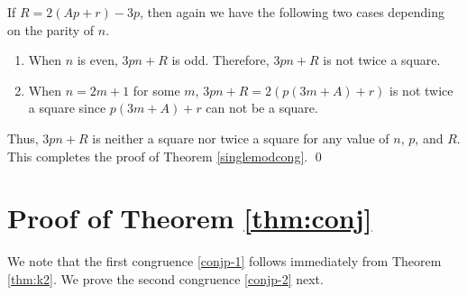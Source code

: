 \documentclass[12pt,reqno]{amsart}
\numberwithin{equation}{section}
\begin{document}
If $R=2(Ap+r)-3p$, then again we have the following two cases depending on the parity of $n$.
\begin{enumerate}
    \item[1.] When $n$ is even, $3pn+R$ is odd. Therefore, $3pn+R$ is not twice a square.
    \item[2.] When $n=2m+1$ for some $m$, $3pn+R=2(p(3m+A)+r)$ is not twice a square since $p(3m+A)+r$ can not be a square.
\end{enumerate}

Thus, $3pn+R$ is neither a square nor twice a square for any value of $n$, $p$, and $R$. This completes the proof of Theorem \ref{singlemodcong}. \qed



\section{Proof of Theorem \ref{thm:conj}}\label{sec:conj}

    We note that the first congruence \eqref{conjp-1} follows immediately from Theorem \ref{thm:k2}. We prove the second congruence \eqref{conjp-2} next.
\end{document}
